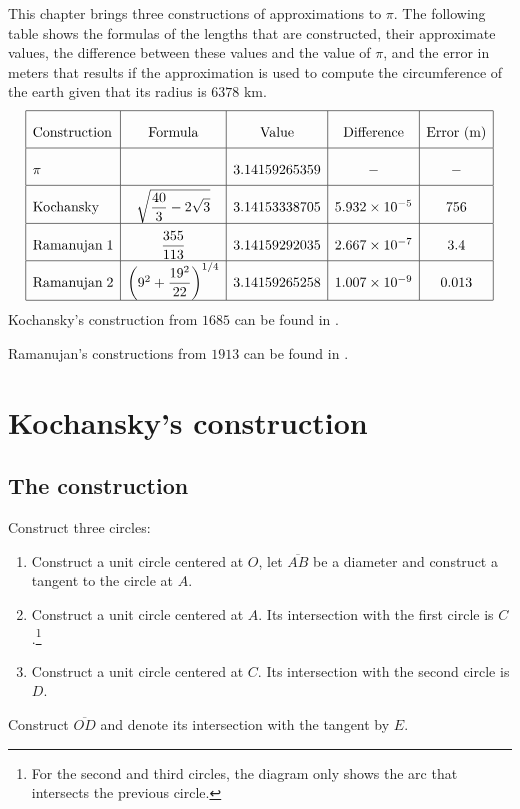 This chapter brings three constructions of approximations to $\pi$. The following table shows the formulas of the lengths that are constructed, their approximate values, the difference between these values and the value of $\pi$, and the error in meters that results if the approximation is used to compute the circumference of the earth given that its radius is $6378$ km.
\[
\renewcommand{\arraystretch}{2.2}
\begin{array}{|l|c|c|c|c|}
\hline
\textrm{Construction} & \textrm{Formula} &\textrm{Value} & \textrm{Difference} & \textrm{Error (m)}\\\hline
\pi & & 3.14159265359 & - & -\\\hline
\textrm{Kochansky} & \sqrt{\disfrac{40}{3}-2\sqrt{3}}&
  3.14153338705 & 5.932 \times 10^{-5} & 756\\\hline
\textrm{Ramanujan}\; 1 & \disfrac{355}{113} &
  3.14159292035 &2.667  \times 10^{-7}&3.4\\\hline
\textrm{Ramanujan}\; 2 &\left(9^2+\disfrac{19^2}{22}\right)^{1/4}&
  3.14159265258 & 1.007 \times 10^{-9}& 0.013\\\hline
\end{array}
\]
Kochansky's construction from $1685$ can be found in \cite{bold}.

Ramanujan's constructions from $1913$ can be found in \cite{ramanujan1,ramanujan2}.

\newpage



\section{Kochansky's construction}

\subsection{The construction}

Construct three circles:
\begin{enumerate}
\item Construct a unit circle centered at $O$, let $\overline{AB}$ be a diameter and construct a tangent to the circle at $A$.
\item Construct a unit circle centered at $A$. Its intersection with the first circle is $C$.\footnote{For the second and third circles, the diagram only shows the arc that intersects the previous circle.}
\item Construct a unit circle centered at $C$. Its intersection with the second circle is $D$. 
\end{enumerate}
Construct $\overline{OD}$ and denote its intersection with the tangent by $E$.

